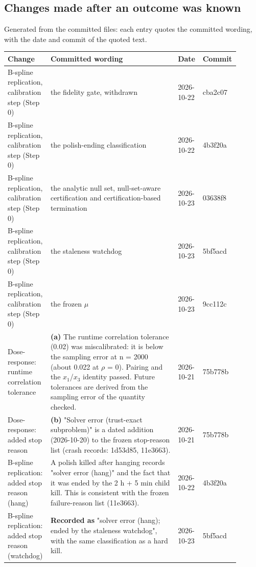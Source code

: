 \subsection*{Changes made after an outcome was known}
Generated from the committed files: each entry quotes the committed wording, with the date and commit of the quoted text.
{\footnotesize\setlength{\tabcolsep}{3pt}
\begin{longtable}{R{0.18\linewidth} R{0.54\linewidth} R{0.10\linewidth} R{0.08\linewidth}}
\toprule
Change & Committed wording & Date & Commit \\
\midrule
\endhead
B-spline replication, calibration step (Step 0) & the fidelity gate, withdrawn & 2026-10-22 & cba2c07 \\
B-spline replication, calibration step (Step 0) & the polish-ending classification & 2026-10-22 & 4b3f20a \\
B-spline replication, calibration step (Step 0) & the analytic null set, null-set-aware certification and certification-based termination & 2026-10-23 & 03638f8 \\
B-spline replication, calibration step (Step 0) & the staleness watchdog & 2026-10-23 & 5bf5acd \\
B-spline replication, calibration step (Step 0) & the frozen $\mu$ & 2026-10-23 & 9cc112c \\
Dose-response: runtime correlation tolerance & \textbf{(a)} The runtime correlation tolerance (0.02) was miscalibrated: it is below the sampling error at n = 2000 (about 0.022 at $\rho$ = 0). Pairing and the $x_{1}$/$x_{3}$ identity passed. Future tolerances are derived from the sampling error of the quantity checked. & 2026-10-21 & 75b778b \\
Dose-response: added stop reason & \textbf{(b)} "Solver error (trust-exact subproblem)" is a dated addition (2026-10-20) to the frozen stop-reason list (crash records: 1d53d85, 11e3663). & 2026-10-21 & 75b778b \\
B-spline replication: added stop reason (hang) & A polish killed after hanging records "solver error (hang)" and the fact that it was ended by the 2 h + 5 min child kill. This is consistent with the frozen failure-reason list (11e3663). & 2026-10-22 & 4b3f20a \\
B-spline replication: added stop reason (watchdog) & \textbf{Recorded as} "solver error (hang); ended by the staleness watchdog", with the same classification as a hard kill. & 2026-10-23 & 5bf5acd \\

\end{longtable}}
